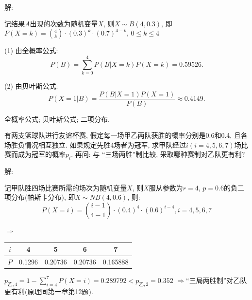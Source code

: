 \documentclass[standard]{ExBook}
\begin{document}
\begin{qitems}
\vspace{-5em}

    \begin{bbox}
解: 

记结果$A$出现的次数为随机变量$X$, 则$X\sim B(4,0.3)$, 即$P(X=k)=\binom{4}{k}\cdot(0.3)^k\cdot(0.7)^{4-k}$, $0 \leq k \leq 4$

(1) 由全概率公式:
$$P(B)=\sum\limits_{k=0}^{4}P(B|X=k)P(X=k)=0.59526.$$

(2) 由贝叶斯公式:
$$P(X=1|B)=\frac{P(B|X=1)P(X=1)}{P(B)}\approx0.4149.$$

\textcolor{themeColor}{\selectfont {} 全概率公式; 贝叶斯公式; 二项分布.}
    \end{bbox}

\vspace{-5em}

    \begin{bbox}
    \begin{shaded}
        \qitem
有两支篮球队进行友谊杯赛, 假定每一场甲乙两队获胜的概率分别是0.6和0.4, 且各场胜负情况相互独立. 如果规定先胜4场者为冠军, 求甲队经过$i(i=4,5,6,7)$场比赛而成为冠军的概率$p_{i}$. 再问: 与 ``三场两胜''制比较, 采取哪种赛制对乙队更有利?
    \end{shaded}
    \end{bbox}

\vspace{-5em}

    \begin{bbox}
解: 

记甲队胜四场比赛所需的场次为随机变量$X$, 则$X$服从参数为$r=4$, $p=0.6$的负二项分布(帕斯卡分布), 即$X\sim NB(4,0.6)$, 则:
$$P(X=i)=\binom{i-1}{4-1}\cdot(0.4)^{4}\cdot(0.6)^{i-4},i=4,5,6,7$$
\begin{center}
    $\Longrightarrow$
\setlength{\tabcolsep}{20pt}
\begin{tabular}{c|c|c|c|c}
    \hline
    $i$ & 4 & 5 & 6 & 7 \\
    \hline
    $P$ & 0.1296 & 0.20736 & 0.20736 & 0.165888\\
    \hline
\end{tabular}
\end{center}
$p_{\text{乙},4}=1-\sum\limits_{i=4}^{7}P(X=i)=0.289792 < p_{\text{乙},2}=0.352$ $\Longrightarrow$``三局两胜制''对乙队更有利(原理同第一章第12题).
    \end{bbox}

\vspace{-5em}


\end{qitems}
\end{document}
